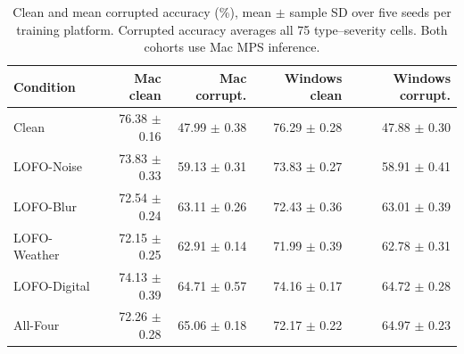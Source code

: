 \begin{table}[!htbp]
\centering
\small
\setlength{\tabcolsep}{5pt}
\caption{Clean and mean corrupted accuracy (\%), mean $\pm$ sample SD over five seeds per training platform. Corrupted accuracy averages all 75 type--severity cells. Both cohorts use Mac MPS inference.}
\label{tab:overall}
\begin{tabular}{lrrrr}
\toprule
Condition & Mac clean & Mac corrupt. & Windows clean & Windows corrupt. \\
\midrule
Clean & 76.38 $\pm$ 0.16 & 47.99 $\pm$ 0.38 & 76.29 $\pm$ 0.28 & 47.88 $\pm$ 0.30 \\
LOFO-Noise & 73.83 $\pm$ 0.33 & 59.13 $\pm$ 0.31 & 73.83 $\pm$ 0.27 & 58.91 $\pm$ 0.41 \\
LOFO-Blur & 72.54 $\pm$ 0.24 & 63.11 $\pm$ 0.26 & 72.43 $\pm$ 0.36 & 63.01 $\pm$ 0.39 \\
LOFO-Weather & 72.15 $\pm$ 0.25 & 62.91 $\pm$ 0.14 & 71.99 $\pm$ 0.39 & 62.78 $\pm$ 0.31 \\
LOFO-Digital & 74.13 $\pm$ 0.39 & 64.71 $\pm$ 0.57 & 74.16 $\pm$ 0.17 & 64.72 $\pm$ 0.28 \\
All-Four & 72.26 $\pm$ 0.28 & 65.06 $\pm$ 0.18 & 72.17 $\pm$ 0.22 & 64.97 $\pm$ 0.23 \\
\bottomrule
\end{tabular}
\end{table}
